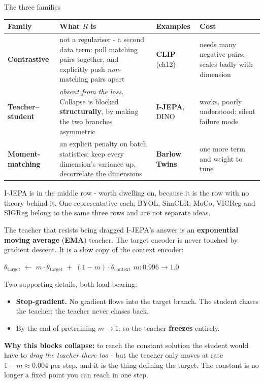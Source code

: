 \documentclass[aspectratio=169]{beamer}
\begin{document}
\begin{frame}{The three families}
  \scriptsize
  \begin{tabular}{@{}p{3.0cm}p{4.3cm}p{2.6cm}p{3.1cm}@{}}
    \textbf{Family} & \textbf{What $R$ is} & \textbf{Examples} & \textbf{Cost} \\[2pt]
    \hline\rule{0pt}{2.6ex}
    \textbf{Contrastive} &
      not a regulariser - a second data term: pull matching pairs together, and explicitly
      push \emph{non}-matching pairs apart &
      \textbf{CLIP} (ch12) &
      needs many negative pairs; scales badly with dimension \\[8pt]
    \textbf{Teacher--student} &
      \emph{absent from the loss.} Collapse is blocked \textbf{structurally}, by making the
      two branches asymmetric &
      \textbf{I-JEPA}, DINO &
      works, poorly understood; silent failure mode \\[8pt]
    \textbf{Moment-matching} &
      an explicit penalty on batch statistics: keep every dimension's variance up,
      decorrelate the dimensions &
      \textbf{Barlow Twins} &
      one more term and weight to tune \\
  \end{tabular}
  \vskip 8pt
  \normalsize
  I-JEPA is in the middle row - worth dwelling on, because it is the row with no theory
  behind it.
  \vskip 4pt
  \footnotesize\color{gray}
  One representative each; BYOL, SimCLR, MoCo, VICReg and SIGReg belong to the same three
  rows and are not separate ideas.
\end{frame}

\begin{frame}{The teacher that resists being dragged}
  \small
  I-JEPA's answer is an \textbf{exponential moving average} (\textbf{EMA}) teacher. The
  target encoder is never touched by gradient descent. It is a slow copy of the context
  encoder:
  \vskip 4pt
  \begin{center}
    $\theta_{\text{target}} \;\leftarrow\; m \cdot \theta_{\text{target}} \;+\;
     (1-m)\cdot \theta_{\text{context}}$
    \qquad $m: 0.996 \rightarrow 1.0$
  \end{center}
  \vskip 8pt
  Two supporting details, both load-bearing:
  \begin{itemize}\small
    \item \textbf{Stop-gradient.} No gradient flows into the target branch. The student
      chases the teacher; the teacher never chases back.
    \item By the end of pretraining $m \rightarrow 1$, so the teacher \textbf{freezes}
      entirely.
  \end{itemize}
  \vskip 6pt
  \textbf{Why this blocks collapse:} to reach the constant solution the student would have
  to \emph{drag the teacher there too} - but the teacher only moves at rate $1-m \approx
  0.004$ per step, and it is the thing defining the target. The constant is no longer a
  fixed point you can reach in one step.
\end{frame}
\end{document}
